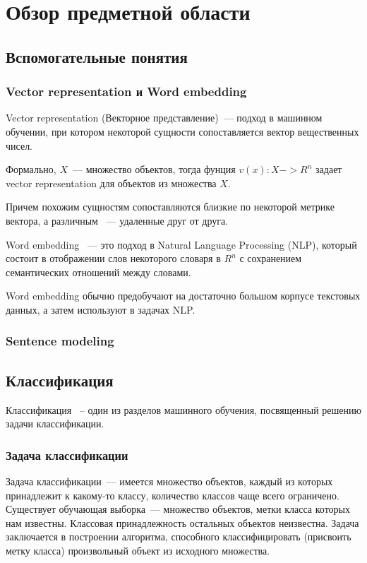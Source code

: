 
\chapter{Обзор предметной области}

\section{Вспомогательные понятия}

\subsection{Vector representation и Word embedding}
Vector representation (Векторное представление)~--- подход в машинном обучении, при котором некоторой сущности
сопоставляется вектор вещественных чисел.

Формально, $X$~--- множество объектов, тогда фунция $v(x):X -> R^n$
задает vector representation для объектов из множества $X$.

Причем похожим сущностям сопоставляются близкие
по некоторой метрике вектора, а различным ~--- удаленные друг от друга.

Word embedding ~--- это подход в Natural Language Processing (NLP), который
состоит в отображении слов некоторого словаря в $R^n$ с сохранением
семантических отношений между словами.

Word embedding обычно предобучают на достаточно большом корпусе текстовых
данных, а затем используют в задачах NLP.


\subsection{Sentence modeling}

\section{Классификация}

Классификация ~-- один из разделов машинного обучения, посвященный решению
задачи классификации.

\subsection{Задача классификации}

Задача классификации~--- имеется множество объектов, каждый из которых принадлежит
к какому-то классу, количество классов чаще всего ограничено.
Существует обучающая выборка~--- множество объектов, метки
класса которых нам известны. Классовая принадлежность остальных объектов
неизвестна. Задача заключается в построении алгоритма, способного
классифицировать (присвоить метку класса) произвольный объект из исходного множества.


